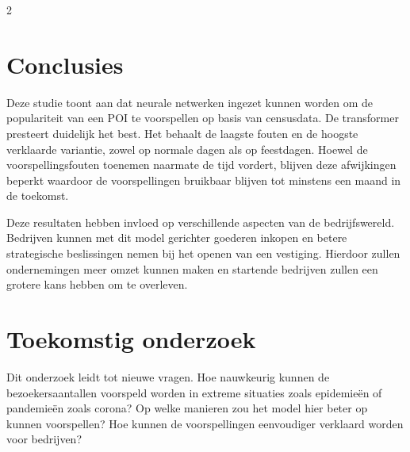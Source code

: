 \documentclass[a0,portrait]{hogent-poster}
\begin{document}
\begin{multicols}{2}
\vspace{10mm}

\section{Conclusies}

Deze studie toont aan dat neurale netwerken ingezet kunnen worden om de populariteit van een POI te voorspellen op basis van censusdata. De transformer presteert duidelijk het best. Het behaalt de laagste fouten en de hoogste verklaarde variantie, zowel op normale dagen als op feestdagen. Hoewel de voorspellingsfouten toenemen naarmate de tijd vordert, blijven deze afwijkingen beperkt waardoor de voorspellingen bruikbaar blijven tot minstens een maand in de toekomst.

Deze resultaten hebben invloed op verschillende aspecten van de bedrijfswereld. Bedrijven kunnen met dit model gerichter goederen inkopen en betere strategische beslissingen nemen bij het openen van een vestiging. Hierdoor zullen ondernemingen meer omzet kunnen maken en startende bedrijven zullen een grotere kans hebben om te overleven.

\section{Toekomstig onderzoek}

Dit onderzoek leidt tot nieuwe vragen. Hoe nauwkeurig kunnen de bezoekersaantallen voorspeld worden in extreme situaties zoals epidemieën of pandemieën zoals corona? Op welke manieren zou het model hier beter op kunnen voorspellen? Hoe kunnen de voorspellingen eenvoudiger verklaard worden voor bedrijven?

\end{multicols}
\end{document}

